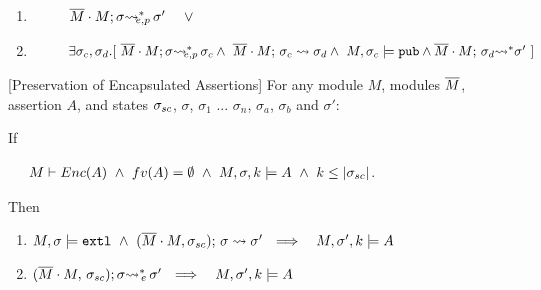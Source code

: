 {{\begin{auxLemma}
\begin{enumerate}
\begin{enumerate}
\item
$\strut \ \ \ \ \ \ \ \    \leadstoBoundedExtPub {\Mtwo\cdot M}    {\sigma}  {\sigma'}\ \ \ \  \vee$
\item
$\strut \ \ \ \ \ \ \ \    \exists \sigma_c,\sigma_d.[\ 
\leadstoBoundedExtPub {\Mtwo\cdot M}    {\sigma}  {\sigma_c} 
\wedge\ \leadstoBounded  {\Mtwo\cdot M}    {\sigma_c}  {\sigma_d} 
\wedge \ M, \sigma_c \models \pubMeth \wedge \leadstoBoundedStar  {\Mtwo\cdot M}    {\sigma_d}  {\sigma'} \ ]
$
\end{enumerate}
\end{enumerate}
\end{auxLemma}
 



\begin{auxLemma}
\label{lemma:external_exec_preserves_more}[Preservation of Encapsulated Assertions]
For any module $M$, modules $\overline{M}$,  assertion  $A$, and 
 states $\sigma_{sc}$, $\sigma$, $\sigma_1$ ... $\sigma_n$, $\sigma_a$, $\sigma_b$ and $\sigma'$:

\noindent
If

\noindent
 $\strut \hspace{.5cm} M \vdash \encaps A \   \wedge   \ fv(A)=\emptyset \  \wedge \ 
\satDAssertFrom M {\sigma} k A \ \wedge \ k \leq \DepthSt {\sigma\bd}$. 

\noindent
Then

\begin{enumerate}
\item
\label{lemma:external_exec_preserves_more:one}
$  M, \sigma  \models \mbox{\normalfont{\texttt{extl}}} \ \wedge \  (\overline{M}\cdot M, \sigma_{sc});\, {\sigma} \rightsquigarrow \sigma' 
\ \ \Longrightarrow \ \ \ M,\sigma' ,{k} \models {A} $

\item
$   (\overline{M}\cdot M,\, {\sigma_{sc}}); \sigma{\rightsquigarrow^*}\!\!_{e}\, \sigma' 
\ \ \Longrightarrow \ \ \ M,\sigma' ,{k} \models {A} $


\end{enumerate}
\end{auxLemma}}}
